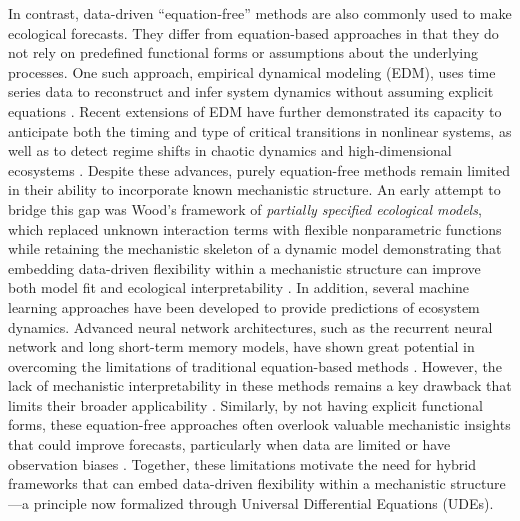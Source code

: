\documentclass[openacc]{rsproca_new}%
\begin{document}
In contrast, data-driven ``equation-free'' methods are also commonly used to make ecological forecasts. They differ from equation-based approaches in that they do not rely on predefined functional forms or assumptions about the underlying processes. One such approach, empirical dynamical modeling (EDM), uses time series data to reconstruct and infer system dynamics without assuming explicit equations \cite{sugihara, perretti2013, Munch2024}. Recent extensions of EDM have further demonstrated its capacity to anticipate both the timing and type of critical transitions in nonlinear systems, as well as to detect regime shifts in chaotic dynamics and high-dimensional ecosystems \cite{grziwotz2023, huang2024, garain2025}. Despite these advances, purely equation-free methods remain limited in their ability to incorporate known mechanistic structure. An early attempt to bridge this gap was Wood's \citeyear{wood2001} framework of \textit{partially specified ecological models}, which replaced unknown interaction terms with flexible nonparametric functions while retaining the mechanistic skeleton of a dynamic model demonstrating that embedding data-driven flexibility within a mechanistic structure can improve both model fit and ecological interpretability \cite{wood2001}. In addition, several machine learning approaches have been developed to provide predictions of ecosystem dynamics. Advanced neural network architectures, such as the recurrent neural network and long short-term memory models, have shown great potential in overcoming the limitations of traditional equation-based methods \cite{Hochreiter}. However, the lack of mechanistic interpretability in these methods remains a key drawback that limits their broader applicability \cite{lipton2015}. Similarly, by not having explicit functional forms, these equation-free approaches often overlook valuable mechanistic insights that could improve forecasts, particularly when data are limited or have observation biases \cite{perretti2015estimating, Greff_2017}. Together, these limitations motivate the need for hybrid frameworks that can embed data-driven flexibility within a mechanistic structure---a principle now formalized through Universal Differential Equations (UDEs).
\end{document}
